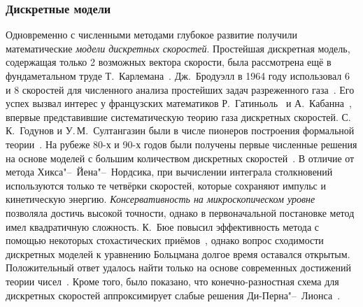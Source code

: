 \subsubsection{Дискретные модели}




Одновременно с численными методами глубокое развитие получили математические \emph{модели дискретных скоростей}.
Простейшая дискретная модель, содержащая только 2 возможных вектора скорости,
была рассмотрена ещё в фундаметальном труде Т.~Карлемана~\cite{Carleman1957}.
Дж.~Бродуэлл в 1964 году использовал 6 и 8 скоростей для численного анализа простейших задач
разреженного газа~\cite{Broadwell1964shock, Broadwell1964shear}.
Его успех вызвал интерес у французских математиков Р.~Гатиньоль~\cite{Gatignol1975} и А.~Кабанна~\cite{Cabannes1980},
впервые представившие систематическую теорию газа дискретных скоростей.
С.\,К.~Годунов и У.\,М.~Султангазин были в числе пионеров построения формальной теории~\cite{Sultangazin1971}.
На рубеже 80-х и 90-х годов были получены первые численные решения на основе моделей
с большим количеством дискретных скоростей~\cite{Goldstein1989, Inamuro1990}.
В отличие от метода Хикса"--~Йена"--~Нордсика, при вычислении интеграла столкновений используются
только те четвёрки скоростей, которые сохраняют импульс и кинетическую энергию.
\emph{Консервативность на микроскопическом уровне} позволяла достичь высокой точности,
однако в первоначальной постановке метод имел квадратичную сложность.
К.~Бюе повысил эффективность метода с помощью некоторых стохастических приёмов~\cite{Buet1996},
однако вопрос сходимости дискретных моделей к уравнению Больцмана долгое время оставался открытым.
Положительный ответ удалось найти только на основе современных достижений теории чисел~\cite{Palczewski1997}.
Кроме того, было показано, что конечно-разностная схема для дискретных скоростей
аппроксимирует слабые решения Ди-Перна"--~Лионса~\cite{Mischler1997, Palczewski1998}.

